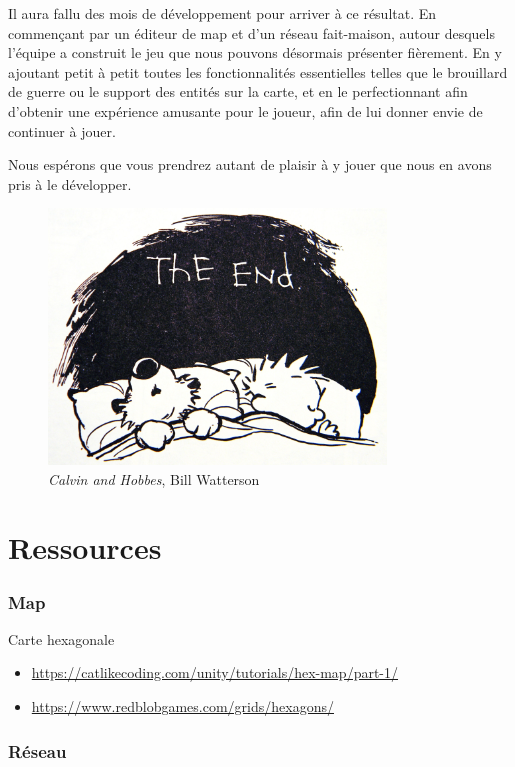 \documentclass[12pt]{report}
\begin{document}
Il aura fallu des mois de développement pour arriver à ce résultat. En
commençant par un éditeur de map et d’un réseau fait-maison, autour desquels
l’équipe a construit le jeu que nous pouvons désormais présenter fièrement. En y
ajoutant petit à petit toutes les fonctionnalités essentielles telles que le
brouillard de guerre ou le support des entités sur la carte, et en le
perfectionnant afin d’obtenir une expérience amusante pour le joueur, afin de
lui donner envie de continuer à jouer.

Nous espérons que vous prendrez autant de plaisir à y jouer que nous en avons
pris à le développer.

\begin{figure}
    \centering
    \includegraphics[width=0.8\textwidth]{project_mood}
    \caption*{\textit{Calvin and Hobbes}, Bill Watterson}
\end{figure}

\chapter{Ressources}

\subsection*{Map}

Carte hexagonale
\begin{itemize}
    \item \url{https://catlikecoding.com/unity/tutorials/hex-map/part-1/}
    \item \url{https://www.redblobgames.com/grids/hexagons/}
\end{itemize}

\subsection*{Réseau}
\end{document}
